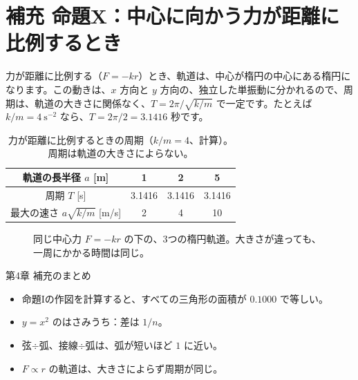 \documentclass[a4paper,11pt,openany]{ltjsbook}
\begin{document}
\section{補充 命題X：中心に向かう力が距離に比例するとき}

力が距離に比例する（$F=-kr$）とき、軌道は、中心が楕円の中心にある楕円になります。この動きは、$x$ 方向と $y$ 方向の、独立した単振動に分かれるので、周期は、軌道の大きさに関係なく、$T=2\pi/\sqrt{k/m}$ で一定です。たとえば $k/m=4\ \mathrm{s^{-2}}$ なら、$T=2\pi/2=3.1416$ 秒です。

\begin{table}[htbp]
\centering
\begin{tabular}{c|ccc}
\toprule
軌道の長半径 $a$ [m] & 1 & 2 & 5\\
\midrule
周期 $T$ [s] & 3.1416 & 3.1416 & 3.1416\\
最大の速さ $a\sqrt{k/m}$ [m/s] & 2 & 4 & 10\\
\bottomrule
\end{tabular}
\caption{力が距離に比例するときの周期（$k/m=4$、計算）。周期は軌道の大きさによらない。}
\end{table}

\begin{figure}[htbp]
\centering
{}
\caption{同じ中心力 $F=-kr$ の下の、3つの楕円軌道。大きさが違っても、一周にかかる時間は同じ。}
\end{figure}

\begin{pointbox}{第4章 補充のまとめ}
\begin{itemize}[leftmargin=*]
\item 命題Iの作図を計算すると、すべての三角形の面積が $0.1000$ で等しい。
\item $y=x^2$ のはさみうち：差は $1/n$。
\item 弦$\div$弧、接線$\div$弧は、弧が短いほど $1$ に近い。
\item $F\propto r$ の軌道は、大きさによらず周期が同じ。
\end{itemize}
\end{pointbox}
\end{document}

